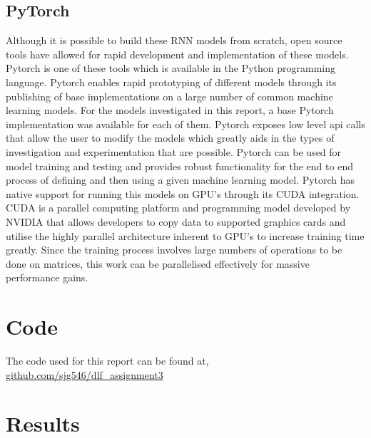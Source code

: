 \documentclass[10pt,twocolumn,letterpaper]{article}
\begin{document}
\subsection{PyTorch}
Although it is possible to build these RNN models from scratch,
open source tools have allowed for rapid development and
implementation of these models. Pytorch is one of these
tools which is available in the Python programming language. Pytorch enables rapid 
prototyping of different models through its publishing of base implementations on a
large number of common machine learning models. For
the models investigated in this report, a base Pytorch implementation was available 
for each of them. Pytorch exposes
low level api calls that allow the user to modify the models
which greatly aids in the types of investigation and experimentation that are 
possible. Pytorch can be used for model
training and testing and provides robust functionality for the
end to end process of defining and then using a given machine learning model. 
Pytorch has native support for running this models on GPU's through its CUDA integration.
CUDA is a parallel computing platform and programming
model developed by NVIDIA  that allows developers to
copy data to supported graphics cards and utilise the highly
parallel architecture inherent to GPU's to increase training
time greatly. Since the training process involves large numbers of operations to be done on matrices, this work can be
parallelised effectively for massive performance gains.
\section{Code}
The code used for this report can be found at,
\href{https://github.com/sjg546/dlf_assignment3}{github.com/sjg546/dlf\_assignment3}

\section {Results}
\end{document}
